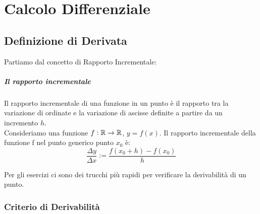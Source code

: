 
\chapter{Calcolo Differenziale}
\section{Definizione di Derivata}
Partiamo dal concetto di Rapporto Incrementale:
\paragraph*{Il rapporto incrementale}
Il rapporto incrementale di una funzione in un punto è il rapporto tra la variazione di ordinate e la variazione di ascisse definite a partire da un incremento $h$.
\\Consideriamo una funzione $f:\mathbb{R}\to\mathbb{R}$, $y=f(x)$.
Il rapporto incrementale della funzione f nel punto generico punto $x_0$ è:
\[
	\frac{\Delta y}{\Delta x} := \frac{f(x_0+h)-f(x_0)}{h}	
\]

Per gli esercizi ci sono dei trucchi più rapidi per verificare la derivabilità di un punto.



\subsection{Criterio di Derivabilità}



